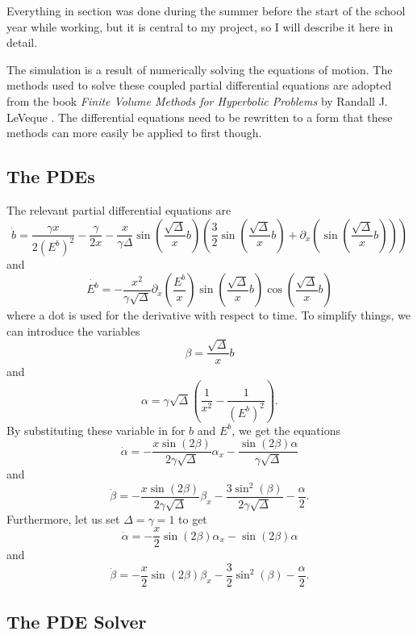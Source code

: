 \documentclass[12pt]{article}
\begin{document}
Everything in section was done during the summer before the start of the school year
while working, but it is central to my project, so I will describe it here in detail.

The simulation is a result of numerically solving the equations of motion. The methods
used to solve these coupled partial differential equations are adopted from the book
\textit{Finite Volume Methods for Hyperbolic Problems} by Randall J. LeVeque \cite{fvm}.
The differential equations need to be rewritten to a form that these methods can more
easily be applied to first though.

\subsection{The PDEs}

The relevant partial differential equations are
\[ \dot{b} = \frac{\gamma x}{2(E^b)^2} - \frac{\gamma}{2x} - \frac{x}{\gamma\Delta}
\sin\left( \frac{\sqrt{\Delta}}{x}b \right) \left( \frac{3}{2}\sin\left(
\frac{\sqrt{\Delta}}{x}b \right) + \partial_x \left(
\sin\left(\frac{\sqrt{\Delta}}{x}b\right) \right) \right) \]
and
\[ \dot{E^b} = -\frac{x^2}{\gamma\sqrt{\Delta}} \partial_x \left( \frac{E^b}{x} \right)
\sin \left( \frac{\sqrt{\Delta}}{x}b \right) \cos \left( \frac{\sqrt{\Delta}}{x}b
\right) \]
where a dot is used for the derivative with respect to time. To simplify things, we can
introduce the variables
\[ \beta = \frac{\sqrt{\Delta}}{x}b \]
and
\[ \alpha = \gamma\sqrt{\Delta} \left( \frac{1}{x^2} - \frac{1}{(E^b)^2} \right). \]
By substituting these variable in for $b$ and $E^b$, we get the equations
\[ \dot{\alpha} = -\frac{x\sin(2\beta)}{2\gamma\sqrt{\Delta}}\alpha_x -
\frac{\sin(2\beta)\alpha}{\gamma\sqrt{\Delta}} \]
and
\[ \dot{\beta} = -\frac{x\sin(2\beta)}{2\gamma\sqrt{\Delta}}\beta_x -
\frac{3\sin^2(\beta)}{2\gamma\sqrt{\Delta}} - \frac{\alpha}{2}. \]
Furthermore, let us set $\Delta = \gamma = 1$ to get
\begin{equation*}
    \dot{\alpha} = -\frac{x}{2}\sin(2\beta)\alpha_x - \sin(2\beta)\alpha
\end{equation*}
and
\begin{equation*}
    \dot{\beta} = -\frac{x}{2}\sin(2\beta)\beta_x - \frac{3}{2}\sin^2(\beta) -
    \frac{\alpha}{2}.
\end{equation*}

\subsection{The PDE Solver}
\end{document}

